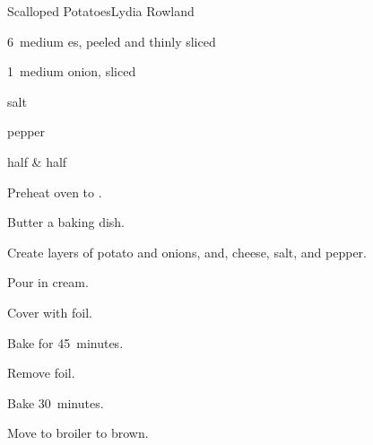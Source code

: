 \begin{recipe}{Scalloped Potatoes}{Lydia Rowland}{}

\begin{ingredients}
\item 6~medium es, peeled and thinly sliced
\item 1~medium onion, sliced
\item {} salt
\item \tp{\quarter} pepper
\item \C{1\half} half \& half 
\item {}
\end{ingredients}

\begin{directions}
\item Preheat oven to .
\item Butter a baking dish.
\item Create layers of potato and onions, and, cheese, salt, and pepper.
\item Pour in cream.
\item Cover with foil.
\item Bake for 45~minutes.
\item Remove foil.
\item Bake 30~minutes.
\item Move to broiler to brown.
\end{directions}

\end{recipe}
